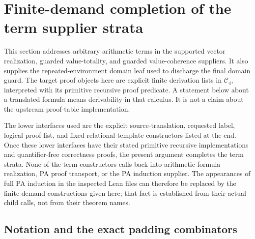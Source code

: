 \section{Finite-demand completion of the term supplier strata}
\label{sec:term-leaf-completion}

This section addresses arbitrary arithmetic terms in the supported vector
realization, guarded value-totality, and guarded value-coherence suppliers.
It also supplies the repeated-environment domain leaf used to discharge
the final domain guard.  The target proof objects here are explicit
finite derivation lists in $\mathcal C_4$, interpreted with its primitive
recursive proof predicate.  A statement below about a translated formula
means derivability in that calculus.  It is not a claim about the
upstream  proof-table implementation.

The lower interfaces used are the explicit source-translation, requested
label, logical proof-list, and fixed relational-template constructors
listed at the end.  Once these lower interfaces have their stated
primitive recursive implementations and quantifier-free correctness
proofs, the present argument completes the term strata.  None of the
term constructors calls back into arithmetic formula realization, PA
proof transport, or the PA induction supplier.  The appearances of full
PA induction in the inspected Lean files can therefore be replaced by
the finite-demand constructions given here; that fact is established
from their actual child calls, not from their theorem names.

\subsection{Notation and the exact padding combinators}

